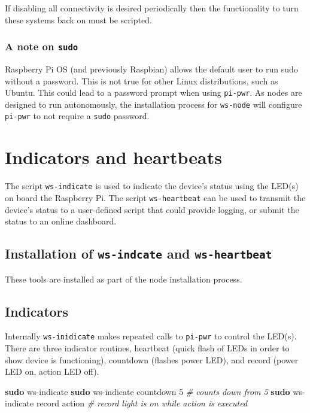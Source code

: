 \documentclass[
]{book}
\newenvironment{Shaded}{\begin{snugshade}}{\end{snugshade}}
\newcommand{\CommentTok}[1]{\textcolor[rgb]{0.56,0.35,0.01}{\textit{#1}}}
\newcommand{\FunctionTok}[1]{\textcolor[rgb]{0.13,0.29,0.53}{\textbf{#1}}}
\newcommand{\NormalTok}[1]{#1}
\begin{document}
If disabling all connectivity is desired periodically then the functionality to turn these systems back on must be scripted.

\subsection{\texorpdfstring{A note on \texttt{sudo}}{A note on sudo}}\label{a-note-on-sudo}

Raspberry Pi OS (and previously Raspbian) allows the default user to run sudo without a password. This is not true for other Linux distributions, such as Ubuntu. This could lead to a password prompt when using \texttt{pi-pwr}. As nodes are designed to run autonomously, the installation process for \texttt{ws-node} will configure \texttt{pi-pwr} to not require a \texttt{sudo} password.

\chapter{Indicators and heartbeats}\label{indicators-and-heartbeats}

The script \texttt{ws-indicate} is used to indicate the device's status using the LED(s) on board the Raspberry Pi. The script \texttt{ws-heartbeat} can be used to transmit the device's status to a user-defined script that could provide logging, or submit the status to an online dashboard.

\section{\texorpdfstring{Installation of \texttt{ws-indcate} and \texttt{ws-heartbeat}}{Installation of ws-indcate and ws-heartbeat}}\label{installation-of-ws-indcate-and-ws-heartbeat}

These tools are installed as part of the node installation process.

\section{Indicators}\label{indicators}

Internally \texttt{ws-inidicate} makes repeated calls to \texttt{pi-pwr} to control the LED(s). There are three indicator routines, heartbeat (quick flash of LEDs in order to show device is functioning), countdown (flashes power LED), and record (power LED on, action LED off).

\begin{Shaded}
\begin{Highlighting}[]
\FunctionTok{sudo}\NormalTok{ ws{-}indicate}
\FunctionTok{sudo}\NormalTok{ ws{-}indicate countdown 5   }\CommentTok{\# counts down from 5}
\FunctionTok{sudo}\NormalTok{ ws{-}indicate record action }\CommentTok{\# record light is on while action is executed}
\end{Highlighting}
\end{Shaded}
\end{document}
